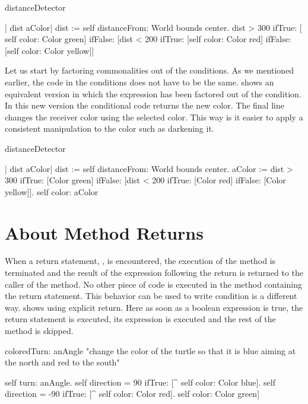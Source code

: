 \begin{method}\label{mth:againDetector}
distanceDetector

   | dist aColor| 
   dist := self distanceFrom: World bounds center.
   dist > 300
     ifTrue: [ self color: Color green]
     ifFalse: [dist < 200
                ifTrue: [self color: Color red]
                ifFalse: [self color: Color yellow]]
\end{method}


Let us start by factoring commonalities out of the conditions. As we mentioned earlier, the code in the conditions does not have to be the same.  shows an equivalent version in which the expression  has  been factored out of the condition. In this new version the conditional code returns the new color. The final line changes the receiver color using the selected color. This way is it easier to apply a consistent manipulation to the color such as darkening it.

\begin{method}\label{mth:detector2}
distanceDetector

   | dist aColor| 
   dist := self distanceFrom: World bounds center.
   aColor := dist > 300
         ifTrue: [Color green]
         ifFalse: [dist < 200
            ifTrue: [Color red]
            ifFalse: [Color yellow]].
   self color: aColor
\end{method}


\section{About Method Returns}
When a return statement, , is encountered, the execution of the method is terminated and the result of the expression following the return is returned to the caller of the method. No other piece of code is executed in the method containing the return statement. This behavior can be used to write condition is a different way.  shows  using explicit return. 
Here as soon as a boolean expression is true, the return statement is executed, \ie its expression is executed and the rest of the method is skipped. 

\begin{method}\label{mth:coloredwithReturn}
coloredTurn: anAngle
    "change the color of the turtle so that it is blue aiming
    at the north and red to the south"

   self turn: anAngle.
   self direction = 90
      ifTrue: [^ self color: Color blue].
   self direction = -90
      ifTrue: [^ self color: Color red].
   self color: Color green]
\end{method}

